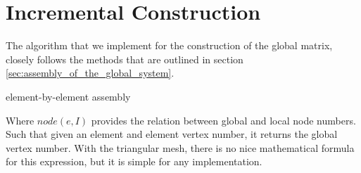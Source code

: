 \documentclass[../fem.tex]{subfile}
\begin{document}
\section{Incremental Construction}%
\label{sec:incremental_construction}

The algorithm that we implement for the construction of the global matrix,
closely follows the methods that are outlined in section
\ref{sec:assembly_of_the_global_system}.

\begin{algorithm}[H]
  \caption{element-by-element assembly}
  \begin{algorithmic}
    \EndFor
  \end{algorithmic}
\end{algorithm}

Where $node(e,I)$ provides the relation between global and local node numbers.
Such that given an element and element vertex number, it returns the global
vertex number. With the triangular mesh, there is no nice mathematical formula
for this expression, but it is simple for any implementation.
\end{document}
